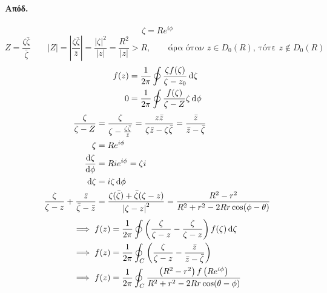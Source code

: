 \documentclass[12pt,a4paper,notitlepage,fleqn]{article}
\begin{document}
    
    \paragraph{Απόδ.}
    \[
    \zeta = Re^{i\phi}
    \]
    \[
    Z = \frac{\zeta\bar\zeta}{\bar\zeta}
    \qquad |Z| = \left| \frac{\zeta\bar\zeta}{\bar z} \right| = 
    \frac{\left|\zeta\right|^2}{|z|} = \frac{R^2}{|z|} > R,
    \qquad \text{άρα όταν $z\in D_0(R)$, τότε $z\notin D_0(R)$}
    \]
    \begin{align*}
    	f(z) &= \frac{1}{2\pi} \oint \frac{\zeta f(\zeta)}{\zeta - z_0}\mathop{}\!\mathrm{d}\zeta
    	\\ 0 &= \frac{1}{2\pi} \oint \frac{f(\zeta)}{\zeta - Z}\zeta \mathop{}\!\mathrm{d}\phi
    \end{align*}
    \begin{align*}
    	\frac{\zeta}{\zeta-Z} &= \frac{\zeta}{\zeta - \frac{\zeta\bar\zeta}{\bar z}}
    	= \frac{z\bar z}{\zeta \bar z - \zeta\bar\zeta}=\frac{\bar z}{\bar z -\bar\zeta}
    	\\
    	\zeta &= Re^{i\phi} \\
    	\od{\zeta}{\phi} &= Rie^{i\phi} = \zeta i \\
    	\dif \zeta &= i\zeta\dif\phi
        \\
        \frac{\zeta}{\zeta-z}+\frac{\bar z}{\bar\zeta -\bar z}
        &= \frac{\zeta(\bar \zeta)+\bar\zeta(\zeta-z)}{\left|\zeta-z\right|^2}
        = \frac{R^2-r^2}{R^2+r^2-2Rr\cos(\phi-\theta)}
    \end{align*}
    \begin{align*}
    \implies f(z) &= \frac{1}{2\pi} \oint
    \left( \frac{\zeta}{\zeta - z} - \frac{\zeta}{\zeta - z} \right) f(\zeta)\mathop{}\!\mathrm{d}\zeta
    \\ \implies f(z) &= \frac{1}{2\pi} \oint_C \left(
    \frac{\zeta}{\zeta-z}-\frac{\bar z}{\bar z - \bar\zeta}
    \right)
    \\ \implies f(z) &= \frac{1}{2\pi} \oint_C 
    \frac{\left(R^2-r^2\right) f\left(Re^{i\phi}\right)}{R^2+r^2-2Rr\cos(\theta-\phi)}
    \end{align*}
    
\end{document}
